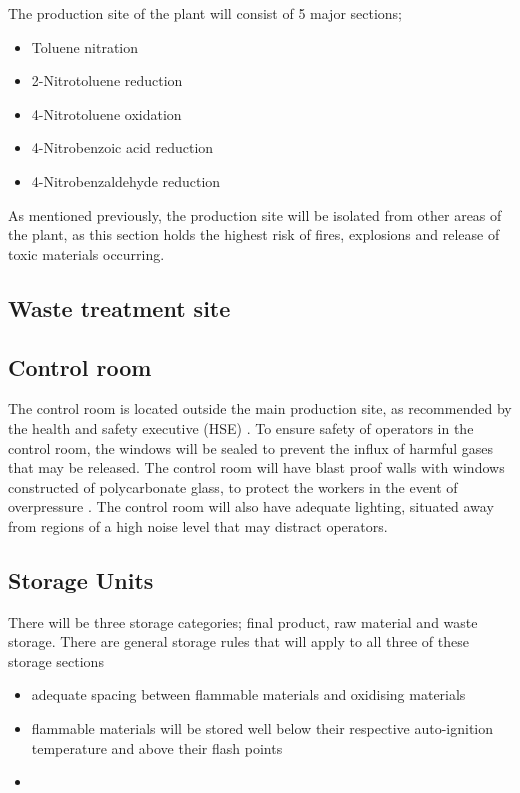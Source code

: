 The production site of the plant will consist of 5 major sections; 

\begin{itemize}
    \item Toluene nitration
    \item 2-Nitrotoluene reduction 
    \item 4-Nitrotoluene oxidation 
    \item 4-Nitrobenzoic acid reduction 
    \item 4-Nitrobenzaldehyde reduction 
\end{itemize}

As mentioned previously, the production site will be isolated from other areas of the plant, as this section holds the highest risk of fires, explosions  and release of toxic materials occurring. 

\subsection{Waste treatment site}





\subsection{Control room}

The control room is located outside the main production site, as recommended by the health and safety executive (HSE) \cite{health_and_safety_executive_control_nodate}. To ensure safety of operators in the control room, the windows will be sealed to prevent the influx of harmful gases that may be released. The control room will have blast proof walls with windows constructed of polycarbonate glass, to protect the workers in the event of overpressure \cite{health_and_safety_executive_control_nodate}. The control room will also have adequate lighting, situated away from regions of a high noise level that may distract operators. 

\subsection{Storage Units}

There will be three storage categories; final product, raw material and waste storage. There are general storage rules that will apply to all three of these storage sections 

\begin{itemize}
    \item adequate spacing between flammable materials and oxidising materials 
    \item flammable materials will be stored well below their respective auto-ignition temperature and above their flash points
    \item 
\end{itemize}


